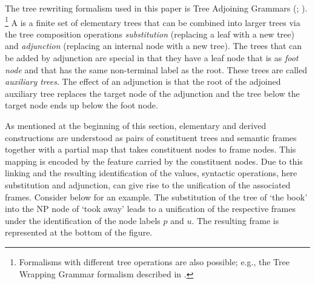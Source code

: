 \documentclass[output=paper,colorlinks,citecolor=brown,chinesefont]{langscibook}
\begin{document}

The tree rewriting formalism used in this paper is Tree Adjoining Grammars (; \citealp{JoshiSchabes:97,AbeilleRambow::00}).%
\footnote{Formalisms with different tree operations are also possible; e.g., the Tree Wrapping Grammar formalism described in \citet{Kallmeyer/Osswald:2023}.}
A  is a finite set of elementary trees that can be combined into larger trees via the tree composition operations \textit{substitution} (replacing a leaf with a new tree) and  \textit{adjunction} (replacing an internal node with a new tree). The trees that can be added by adjunction are special in that they have a leaf node that is  as \textit{foot node} and that has the same non-terminal label as the root. These trees are called \emph{auxiliary trees}. The effect of an adjunction is that the root of the adjoined auxiliary tree replaces the target node of the adjunction and the tree below the target node ends up below the foot node. 

As mentioned at the beginning of this section, elementary and derived constructions are understood as pairs of constituent trees and semantic frames together with a partial map that takes constituent nodes to frame nodes.
This mapping is encoded by the feature  carried by the constituent nodes.
Due to this linking and the resulting identification of the  values, syntactic operations, here substitution and adjunction, can give rise to the unification of the associated frames.
Consider  below for an example.
The substitution of the tree of `the book' into the  NP node of `took away' leads to a unification of the respective frames under the identification of the node labels $p$ and $u$.
The resulting frame is represented at the bottom of the figure.
\end{document}
